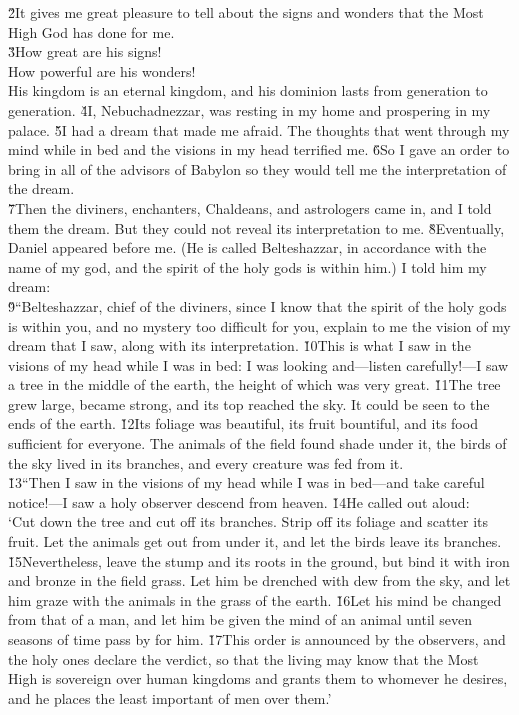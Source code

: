 \begin{poetry}
\poeml \v{2}It gives me great pleasure to tell about the signs and wonders that the Most High God has done for me. \\
\poeml \v{3}How great are his signs! \\
\poeml How powerful are his wonders! \\
\poeml His kingdom is an eternal kingdom, and his dominion lasts from generation to generation.
\poeml \v{4}I, Nebuchadnezzar, was resting in my home and prospering in my palace. \v{5}I had a dream that made me afraid. The thoughts that went through my mind while in bed and the visions in my head terrified me. \v{6}So I gave an order to bring in all of the advisors of Babylon so they would tell me the interpretation of the dream. \\
\poeml \v{7}Then the diviners, enchanters, Chaldeans, and astrologers came in, and I told them the dream. But they could not reveal its interpretation to me. \v{8}Eventually, Daniel appeared before me. (He is called Belteshazzar, in accordance with the name of my god, and the spirit of the holy gods is within him.) I told him my dream: \\
\poeml \v{9}``Belteshazzar, chief of the diviners, since I know that the spirit of the holy gods is within you, and no mystery too difficult for you, explain to me the vision of my dream that I saw, along with its interpretation. \v{10}This is what I saw in the visions of my head while I was in bed: I was looking and---listen carefully!---I saw a tree in the middle of the earth, the height of which was very great. \v{11}The tree grew large, became strong, and its top reached the sky. It could be seen to the ends of the earth. \v{12}Its foliage was beautiful, its fruit bountiful, and its food sufficient for everyone. The animals of the field found shade under it, the birds of the sky lived in its branches, and every creature was fed from it. \\
\poeml \v{13}``Then I saw in the visions of my head while I was in bed---and take careful notice!---I saw a holy observer descend from heaven. \v{14}He called out aloud: \\
\poeml `Cut down the tree and cut off its branches. Strip off its foliage and scatter its fruit. Let the animals get out from under it, and let the birds leave its branches. \v{15}Nevertheless, leave the stump and its roots in the ground, but bind it with iron and bronze in the field grass. Let him be drenched with dew from the sky, and let him graze with the animals in the grass of the earth. \v{16}Let his mind be changed from that of a man, and let him be given the mind of an animal until seven seasons of time pass by for him. \v{17}This order is announced by the observers, and the holy ones declare the verdict, so that the living may know that the Most High is sovereign over human kingdoms and grants them to whomever he desires, and he places the least important of men over them.' \\

\end{poetry}

